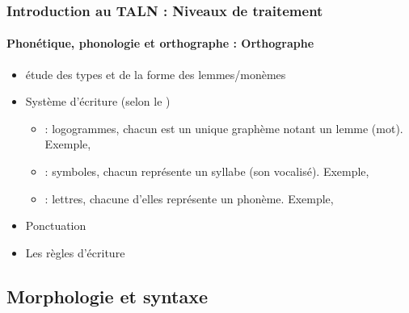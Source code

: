 \documentclass[xcolor=table]{beamer}
\begin{document}
\begin{frame}
\frametitle{Introduction au TALN : Niveaux de traitement}
\framesubtitle{Phonétique, phonologie et orthographe : Orthographe}

\begin{itemize}
	\item étude des types et de la forme des lemmes/monèmes 
	\item Système d'écriture (selon le )
	\begin{itemize}
		\item {} : logogrammes, chacun est un unique graphème notant un lemme (mot).
		Exemple, 
		\item {} : symboles, chacun représente un syllabe (son vocalisé). 
		Exemple, 
		\item {} : lettres, chacune d'elles représente un phonème. 
		Exemple, 
	\end{itemize}
	\item Ponctuation 
	\item Les règles d'écriture 
\end{itemize}

\end{frame}

\subsection{Morphologie et syntaxe}
\end{document}
